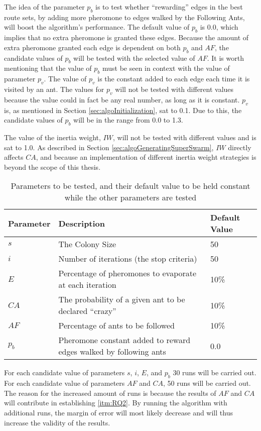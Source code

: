 The idea of the parameter $p_b$ is to test whether ``rewarding'' edges in the best route sets, by adding more pheromone to edges walked by the Following Ants, will boost the algorithm's performance. The default value of $p_b$ is 0.0, which implies that no extra pheromone is granted these edges. Because the amount of extra pheromone granted each edge is dependent on both $p_b$ and $AF$, the candidate values of $p_b$ will be tested with the selected value of $AF$. It is worth mentioning that the value of $p_b$ must be seen in context with the value of parameter $p_v$. The value of $p_v$ is the constant added to each edge each time it is visited by an ant. The values for $p_v$ will not be tested with different values because the value could in fact be any real number, as long as it is constant. $p_v$ is, as mentioned in Section \vref{sec:algoInitialization}, sat to 0.1. Due to this, the candidate values of $p_b$ will be in the range from 0.0 to 1.3. 

The value of the inertia weight, $IW$, will not be tested with different values and is sat to 1.0. As described in Section \vref{sec:algoGeneratingSuperSwarm}, $IW$ directly affects $CA$, and because an implementation of different inertia weight strategies is beyond the scope of this thesis. 

\begin{table}[H]
    \centering
	\begin{tabular}{|l|m{7cm}|l|}
    	\hline
    	\textbf{Parameter} & \textbf{Description} & \textbf{Default Value}\\
    	\hline
    	$s$ & The Colony Size & 50\\
        
    	$i$ & Number of iterations (the stop criteria) & 50\\
        
    	$E$ & Percentage of pheromones to evaporate at each iteration & 10\%\\
        
    	$CA$ & The probability of a given ant to be declared ``crazy'' & 10\%\\
        
    	$AF$ & Percentage of ants to be followed & 10\%\\
        
        $p_b$ & Pheromone constant added to reward edges walked by following ants & 0.0\\
   	    \hline
    \end{tabular}
    \caption {Parameters to be tested, and their default value to be held constant while the other parameters are tested}
    \label{table:parameters}
\end{table}
%
For each candidate value of parameters $s$, $i$, $E$, and $p_b$ 30 runs will be carried out. For each candidate value of parameters $AF$ and $CA$, 50 runs will be carried out. The reason for the increased amount of runs is because the results of $AF$ and $CA$ will contribute in establishing \vref{itm:RQ2}. By running the algorithm with additional runs, the margin of error will most likely decrease and will thus increase the validity of the results.

